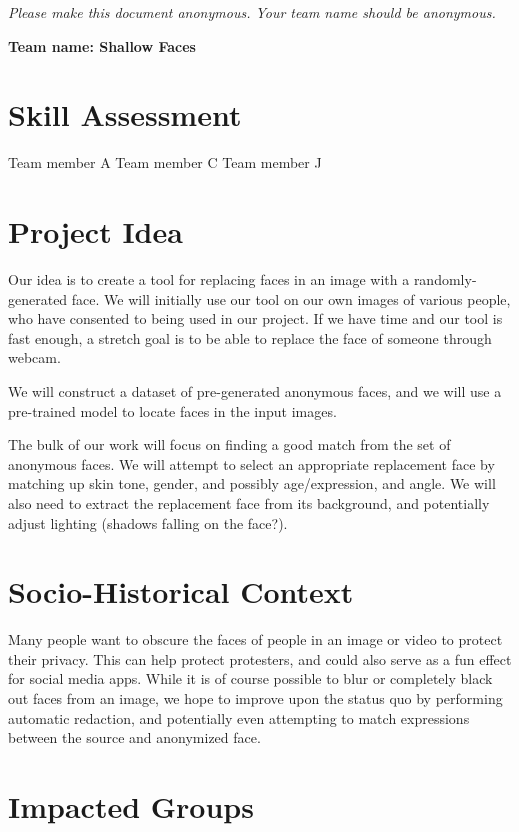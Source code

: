 \emph{Please make this document anonymous. Your team name should be anonymous.}

\textbf{Team name: Shallow Faces}

\section*{Skill Assessment}

Team member A
Team member C
Team member J


\section*{Project Idea}

Our idea is to create a tool for replacing faces in an image with a randomly-generated face. We will initially use our tool on our own images of various people, who have consented to being used in our project. If we have time and our tool is fast enough, a stretch goal is to be able to replace the face of someone through webcam.

We will construct a dataset of pre-generated anonymous faces, and we will use a pre-trained model to locate faces in the input images.

The bulk of our work will focus on finding a good match from the set of anonymous faces. We will attempt to select an appropriate replacement face by matching up skin tone, gender, and possibly age/expression, and angle. We will also need to extract the replacement face from its background, and potentially adjust lighting (shadows falling on the face?).

\section*{Socio-Historical Context}

Many people want to obscure the faces of people in an image or video to protect their privacy. This can help protect protesters, and could also serve as a fun effect for social media apps. While it is of course possible to blur or completely black out faces from an image, we hope to improve upon the status quo by performing automatic redaction, and potentially even attempting to match expressions between the source and anonymized face.

\section*{Impacted Groups}


